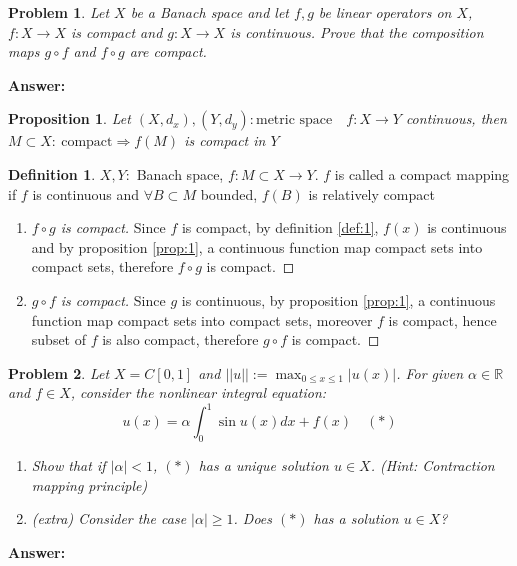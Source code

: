 \documentclass[a4paper,12pt]{article}
\newtheorem{prob}{Problem}[]
\newtheorem{prop}{Proposition}
\theoremstyle{definition}
\newtheorem{definition}{Definition}[]
\newcommand{\R}{\mathbb{R}}
\begin{document}
\begin{prob}
	Let $X$ be a Banach space and let $f,g$ be linear operators on $X$, $f:X \to X$ is compact and $g:X \to X$ is continuous. Prove that the composition maps $g \circ f$ and $f \circ g$ are compact.
\end{prob}
	\textbf{Answer:}
	\begin{prop}\label{prop:1}
		Let $(X,d_x),(Y,d_y): \text{metric space}\quad f:X \to Y$ continuous, then $M\subset X:\ \text{compact} \Rightarrow f(M)$ is compact in $Y$
	\end{prop}
	\begin{definition}\label{def:1}
		$X,Y:$ Banach space, $f:M\subset X \to Y$. $f$ is called a compact mapping if $f$ is continuous and $\forall B \subset M$ bounded, $f(B)$ is relatively compact
	\end{definition}
	\begin{enumerate}
		\item \begin{proof}[$f\circ g$ is compact]
			Since $f$ is compact, by definition \eqref{def:1}, $f(x)$ is continuous and by proposition \eqref{prop:1}, a continuous function map compact sets into compact sets, therefore $f \circ g$ is compact.
		\end{proof}
		\item  \begin{proof}[$g \circ f$ is compact]
			Since $g$ is continuous, by proposition \eqref{prop:1}, a continuous function map compact sets into compact sets, moreover $f$ is compact, hence subset of $f$ is also compact, therefore $g \circ f$ is compact.
		\end{proof}
	\end{enumerate}
\newpage
\begin{prob}
	Let $X = C[0,1]$ and $||u||:= \max_{0\leq x \leq 1} |u(x)|$. For given $\alpha \in \R$ and $f \in X$, consider the nonlinear integral equation:
	$$u(x) = \alpha \int_{0}^{1} \sin u(x) dx + f(x) \quad (*)$$
	\begin{enumerate}
		\item Show that if $|\alpha| < 1$, $(*)$ has a unique solution $u \in X$. (Hint: Contraction mapping principle)
		\item (extra) Consider the case $|\alpha| \geq 1$. Does $(*)$ has a solution $u\in X$?
	\end{enumerate}
\end{prob}
	\textbf{Answer:}
\end{document}
